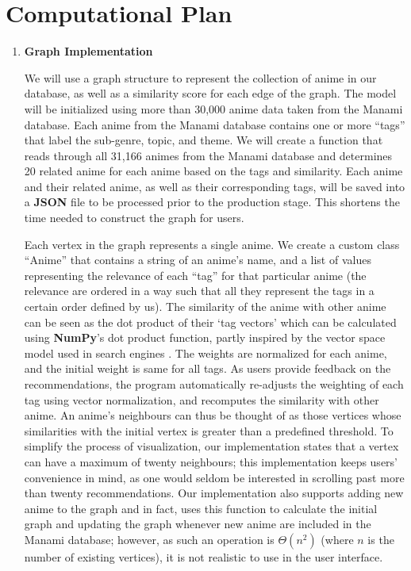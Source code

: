 \documentclass[fontsize=11pt]{article}
\begin{document}
\section*{Computational Plan}

\begin{enumerate}
    \item \textbf{Graph Implementation}
    
    \quad We will use a graph structure to represent the collection of anime in our database, as well as a similarity score for each edge of the graph. The model will be initialized using more than 30,000 anime data taken from the Manami database. Each anime from the Manami database contains one or more “tags” that label the sub-genre, topic, and theme. We will create a function that reads through all 31,166 animes from the Manami database and determines 20 related anime for each anime based on the tags and similarity. Each anime and their related anime, as well as their corresponding tags, will be saved into a \textbf{JSON} file to be processed prior to the production stage. This shortens the time needed to construct the graph for users.
    
    \quad Each vertex in the graph represents a single anime. We create a custom class “Anime” that contains a string of an anime’s name, and a list of values representing the relevance of each “tag” for that particular anime (the relevance are ordered in a way such that all they represent the tags in a certain order defined by us). The similarity of the anime with other anime can be seen as the dot product of their ‘tag vectors’ which can be calculated using \textbf{NumPy}’s dot product function, partly inspired by the vector space model used in search engines \citep{vspace}. The weights are normalized for each anime, and the initial weight is same for all tags. As users provide feedback on the recommendations, the program automatically re-adjusts the weighting of each tag using vector normalization, and recomputes the similarity with other anime. An anime’s neighbours can thus be thought of as those vertices whose similarities with the initial vertex is greater than a predefined threshold. To simplify the process of visualization, our implementation states that a vertex can have a maximum of twenty neighbours; this implementation keeps users' convenience in mind, as one would seldom be interested in scrolling past more than twenty recommendations. Our implementation also supports adding new anime to the graph and in fact, uses this function to calculate the initial graph and updating the graph whenever new anime are included in the Manami database; however, as such an operation is $\Theta(n^2)$ (where $n$ is the number of existing vertices), it is not realistic to use in the user interface.
    

\end{enumerate}
\end{document}
